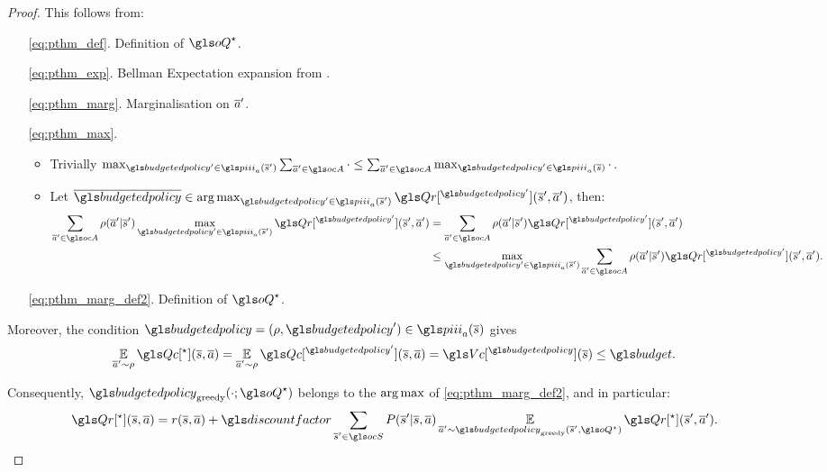 \begin{subappendices}
\begin{proof}
    This follows from:
    \begin{enumerate}
        \item[\eqref{eq:pthm_def}.] Definition of $\oQ^{\star}$.
        \item[\eqref{eq:pthm_exp}.] Bellman Expectation expansion from .
        \item[\eqref{eq:pthm_marg}.] Marginalisation on $\overline{a}'$.
        \item[\eqref{eq:pthm_max}.] \begin{itemize}
            \item Trivially $\max_{\budgetedpolicy'\in\policies_a(\os')} \sum_{\oa'\in\ocA} \cdot \leq \sum_{\oa'\in\ocA} \max_{ \budgetedpolicy'\in\policies_a(\os)} \cdot$.
            \item Let $\ov{\budgetedpolicy}\in\argmax_{\budgetedpolicy'\in\policies_a(\os')} \Qr[^{\budgetedpolicy'}](\os', \oa')$, then:
            \begin{align*}
                \sum_{\oa'\in\ocA}\rho(\oa'|\os')\max_{\budgetedpolicy'\in\policies_a(\os')}\Qr[^{\budgetedpolicy'}](\os', \oa') &= \sum_{\oa'\in\ocA}\rho(\oa'|\os')\Qr[^{\budgetedpolicy'}](\os', \oa') \\
                &\leq  \max_{\budgetedpolicy'\in\policies_a(\os')} \sum_{\oa'\in\ocA}\rho(\oa'|\os')\Qr[^{\budgetedpolicy'}](\os', \oa').
            \end{align*}
        \end{itemize}
        \item[\eqref{eq:pthm_marg_def2}.] Definition of $\oQ^{\star}$.
    \end{enumerate}

    Moreover, the condition $\budgetedpolicy=(\rho, \budgetedpolicy')\in\policies_a(\os)$ gives
    \begin{equation*}
        \expectedvalueover{\oa'\sim\rho} \Qc[^{\star}](\os, \oa) = \expectedvalueover{\oa'\sim\rho} \Qc[^{\budgetedpolicy'}](\os, \oa) = \Vc[^{\budgetedpolicy}](\os) \leq \budget.
    \end{equation*}

    Consequently, $\budgetedpolicy_\text{greedy}(\cdot; \oQ^{\star})$ belongs to the $\operatorname*{arg\,max}$ of \eqref{eq:pthm_marg_def2}, and in particular:
    \begin{equation*}
        \Qr[^{\star}](\os, \oa) = r(\os, \oa) + \discountfactor \sum_{\os'\in\ocS}  P(\os' | \os, \oa) \expectedvalueover{\oa'\sim\budgetedpolicy_\text{greedy}(\os', \oQ^{\star})} \Qr[^{\star}](\os', \oa').
    \end{equation*}


\end{proof}
\end{subappendices}

